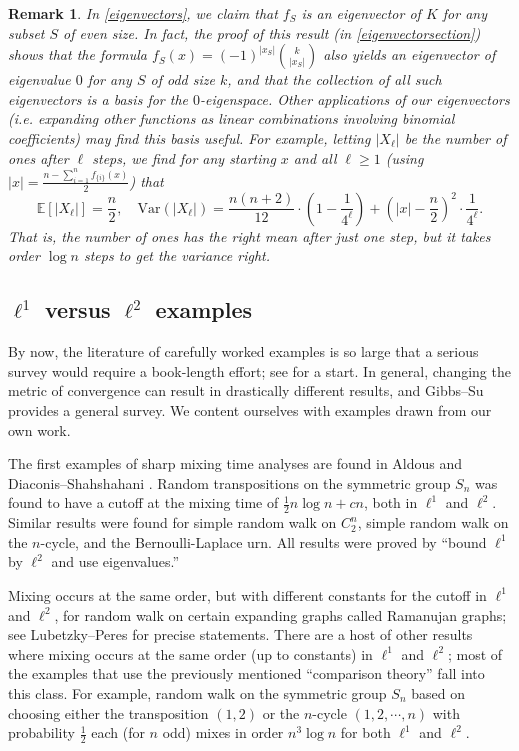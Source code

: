 \documentclass[11pt]{article}
\newcounter{r}
\newcounter{s}
\numberwithin{equation}{section}
\newtheorem*{remark}{Remark}
\begin{document}
\begin{remark}
In \cref{eigenvectors}, we claim that $f_S$ is an eigenvector of $K$ for any subset $S$ of even size. In fact, the proof of this result (in \cref{eigenvectorsection}) shows that the formula $f_S(x) = (-1)^{|x_S|} \binom{k}{|x_S|}$ also yields an eigenvector of eigenvalue $0$ for any $S$ of odd size $k$, and that the collection of all such eigenvectors is a basis for the $0$-eigenspace. Other applications of our eigenvectors (i.e. expanding other functions as linear combinations involving binomial coefficients) may find this basis useful. For example, letting $|X_\ell|$ be the number of ones after $\ell$ steps, we find for any starting $x$ and all $\ell \ge 1$ (using $|x| = \frac{n - \sum_{i=1}^n f_{\{i\}}(x)}{2}$) that
\[
    \mathbb{E}\left[|X_\ell|\right] = \frac{n}{2}, \quad \text{Var}(|X_\ell|) = \frac{n(n+2)}{12} \cdot \left(1 - \frac{1}{4^\ell}\right) + \left(|x| - \frac{n}{2}\right)^2 \cdot \frac{1}{4^\ell}.
\]
That is, the number of ones has the right mean after just one step, but it takes order $\log n$ steps to get the variance right.
\end{remark}

\subsection{$\ell^1$ versus $\ell^2$ examples}\label{l1vsl2subsection}

By now, the literature of carefully worked examples is so large that a serious survey would require a book-length effort; see \cite{saloffcoste} for a start. In general, changing the metric of convergence can result in drastically different results, and Gibbs--Su \cite{choosemetric} provides a general survey. We content ourselves with examples drawn from our own work. 

The first examples of sharp mixing time analyses are found in Aldous \cite{aldous1983} and Diaconis--Shahshahani \cite{randomtranspositions}. Random transpositions on the symmetric group $S_n$ was found to have a cutoff at the mixing time of $\frac{1}{2} n \log n + cn$, both in $\ell^1$ and $\ell^2$. Similar results were found for simple random walk on $C_2^n$, simple random walk on the $n$-cycle, and the Bernoulli-Laplace urn. All results were proved by ``bound $\ell^1$ by $\ell^2$ and use eigenvalues.''

Mixing occurs at the same order, but with different constants for the cutoff in $\ell^1$ and $\ell^2$, for random walk on certain expanding graphs called Ramanujan graphs; see Lubetzky--Peres \cite{cutoffexpanders} for precise statements. There are a host of other results where mixing occurs at the same order (up to constants) in $\ell^1$ and $\ell^2$; most of the examples that use the previously mentioned ``comparison theory'' fall into this class. For example, random walk on the symmetric group $S_n$ based on choosing either the transposition $(1, 2)$ or the $n$-cycle $(1, 2, \cdots, n)$ with probability $\frac{1}{2}$ each (for $n$ odd) mixes in order $n^3 \log n$ for both $\ell^1$ and $\ell^2$.
\end{document}
